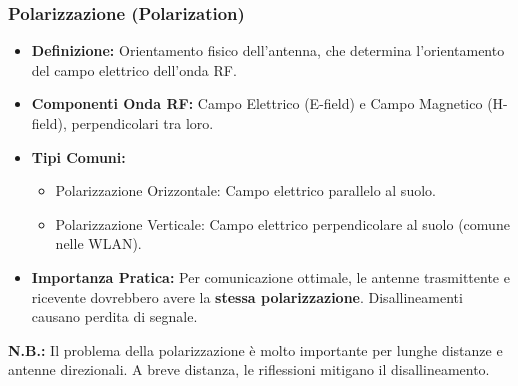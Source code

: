 \documentclass{article}
\begin{document}
\subsubsection{Polarizzazione (Polarization)}
\begin{itemize}
    \item \textbf{Definizione:} Orientamento fisico dell'antenna, che determina l'orientamento del campo elettrico dell'onda RF.
    \item \textbf{Componenti Onda RF:} Campo Elettrico (E-field) e Campo Magnetico (H-field), perpendicolari tra loro.
    \item \textbf{Tipi Comuni:}
    \begin{itemize}
        \item Polarizzazione Orizzontale: Campo elettrico parallelo al suolo.
        \item Polarizzazione Verticale: Campo elettrico perpendicolare al suolo (comune nelle WLAN).
    \end{itemize}
    \item \textbf{Importanza Pratica:} Per comunicazione ottimale, le antenne trasmittente e ricevente dovrebbero avere la \textbf{stessa polarizzazione}. Disallineamenti causano perdita di segnale.
\end{itemize}
\begin{center}
\end{center}
\textbf{N.B.:} Il problema della polarizzazione è molto importante per lunghe distanze e antenne direzionali. A breve distanza, le riflessioni mitigano il disallineamento.
\end{document}
